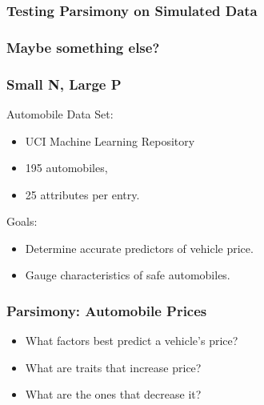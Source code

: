 \documentclass{beamer}
\begin{document}
\begin{frame}
\frametitle{Testing Parsimony on Simulated Data}
\end{frame}

\begin{frame}
\frametitle{Maybe something else?}
\end{frame}

\author[John Chen]{C. Patton, A. Rumbaugh, T. Provan, O. Prilepova, J. Chen}
\begin{frame}
\frametitle{Small N, Large P}
Automobile Data Set:
\begin{itemize}
  \item UCI Machine Learning Repository
  \item 195 automobiles,
  \item 25 attributes per entry.
\end{itemize}
\Large{
Goals:
\begin{itemize}
  \item Determine accurate predictors of vehicle price.
  \item Gauge characteristics of safe automobiles.
\end{itemize}}
\end{frame}


\begin{frame}
\frametitle{Parsimony: Automobile Prices}
\begin{itemize}
  \item What factors best predict a vehicle's price?\\
  \item What are traits that increase price?\\
  \item What are the ones that decrease it?\\
\end{itemize}
\end{frame}
\end{document}
